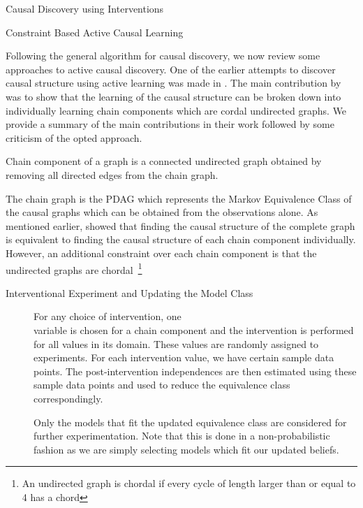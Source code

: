 \documentclass[10pt]{article}
\begin{document}
\begin{psection}[4]{Causal Discovery using Interventions}
    \begin{psubsection}{Constraint Based Active Causal Learning}
    
        Following the general algorithm for causal discovery, we now review some
        approaches to active causal discovery. One of the earlier attempts to discover
        causal structure using active learning was made in \citep{he2008active}. The
        main contribution by \citet{he2008active} was to show that the learning of the
        causal structure can be broken down into individually learning chain components
        which are cordal undirected graphs. We provide a summary of the main
        contributions in their work followed by some criticism of the opted approach.
        
        \begin{definition}
            Chain component of a graph is a connected undirected graph obtained by
            removing all directed edges from the chain graph.
        \end{definition}
        
        The chain graph is the PDAG which represents the Markov Equivalence Class of the
        causal graphs which can be obtained from the observations alone. As mentioned
        earlier, \citet{he2008active} showed that finding the causal structure of the
        complete graph is equivalent to finding the causal structure of each chain
        component individually. However, an additional constraint over each chain
        component is that the undirected graphs are chordal~\footnote{%
            An undirected graph is chordal if every cycle of length larger than or equal
            to 4 has a chord
        }
        
        \begin{description}
            \item[Interventional Experiment and Updating the Model Class]
                For any choice of intervention, one \\ variable is chosen for a chain
                component and the intervention is performed for all values in its
                domain. These values are randomly assigned to experiments. For each
                intervention value, we have certain sample data points. The
                post-intervention independences are then estimated using these sample
                data points and used to reduce the equivalence class correspondingly.
        
                Only the models that fit the updated equivalence class are considered
                for further experimentation. Note that this is done in a
                non-probabilistic fashion as we are simply selecting models which fit
                our updated beliefs.
        

\end{description}
\end{psubsection}
\end{psection}
\end{document}
